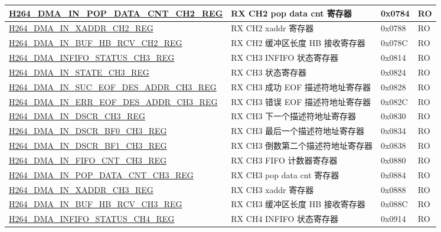 \begin{longtable}{ | p{7.5cm} | p{5.7cm} | p{1.2cm} | p{1cm} | }
    \hyperref[regdesc:H264DMAINPOPDATACNTCH2REG]{H264\_DMA\_IN\_POP\_DATA\_CNT\_CH2\_REG} & RX CH2 pop data cnt 寄存器 & 0x0784 & RO \\ \hline
    \hyperref[regdesc:H264DMAINXADDRCH2REG]{H264\_DMA\_IN\_XADDR\_CH2\_REG} & RX CH2 xaddr 寄存器 & 0x0788 & RO \\ \hline
    \hyperref[regdesc:H264DMAINBUFHBRCVCH2REG]{H264\_DMA\_IN\_BUF\_HB\_RCV\_CH2\_REG} & RX CH2  缓冲区长度 HB 接收寄存器 & 0x078C & RO \\ \hline
    \hyperref[regdesc:H264DMAINFIFOSTATUSCH3REG]{H264\_DMA\_INFIFO\_STATUS\_CH3\_REG} & RX CH3 INFIFO 状态寄存器 & 0x0814 & RO \\ \hline
    \hyperref[regdesc:H264DMAINSTATECH3REG]{H264\_DMA\_IN\_STATE\_CH3\_REG} & RX CH3 状态寄存器 & 0x0824 & RO \\ \hline
    \hyperref[regdesc:H264DMAINSUCEOFDESADDRCH3REG]{H264\_DMA\_IN\_SUC\_EOF\_DES\_ADDR\_CH3\_REG} & RX CH3 成功 EOF 描述符地址寄存器 & 0x0828 & RO \\ \hline
    \hyperref[regdesc:H264DMAINERREOFDESADDRCH3REG]{H264\_DMA\_IN\_ERR\_EOF\_DES\_ADDR\_CH3\_REG} & RX CH3 错误 EOF 描述符地址寄存器 & 0x082C & RO \\ \hline
    \hyperref[regdesc:H264DMAINDSCRCH3REG]{H264\_DMA\_IN\_DSCR\_CH3\_REG} & RX CH3 下一个描述符地址寄存器 & 0x0830 & RO \\ \hline
    \hyperref[regdesc:H264DMAINDSCRBF0CH3REG]{H264\_DMA\_IN\_DSCR\_BF0\_CH3\_REG} & RX CH3 最后一个描述符地址寄存器 & 0x0834 & RO \\ \hline
    \hyperref[regdesc:H264DMAINDSCRBF1CH3REG]{H264\_DMA\_IN\_DSCR\_BF1\_CH3\_REG} & RX CH3 倒数第二个描述符地址寄存器 & 0x0838 & RO \\ \hline
    \hyperref[regdesc:H264DMAINFIFOCNTCH3REG]{H264\_DMA\_IN\_FIFO\_CNT\_CH3\_REG} & RX CH3 FIFO 计数器寄存器 & 0x0880 & RO \\ \hline
    \hyperref[regdesc:H264DMAINPOPDATACNTCH3REG]{H264\_DMA\_IN\_POP\_DATA\_CNT\_CH3\_REG} & RX CH3 pop data cnt 寄存器 & 0x0884 & RO \\ \hline
    \hyperref[regdesc:H264DMAINXADDRCH3REG]{H264\_DMA\_IN\_XADDR\_CH3\_REG} & RX CH3 xaddr 寄存器 & 0x0888 & RO \\ \hline
    \hyperref[regdesc:H264DMAINBUFHBRCVCH3REG]{H264\_DMA\_IN\_BUF\_HB\_RCV\_CH3\_REG} & RX CH3  缓冲区长度 HB 接收寄存器 & 0x088C & RO \\ \hline
    \hyperref[regdesc:H264DMAINFIFOSTATUSCH4REG]{H264\_DMA\_INFIFO\_STATUS\_CH4\_REG} & RX CH4 INFIFO 状态寄存器 & 0x0914 & RO \\ \hline

\end{longtable}
